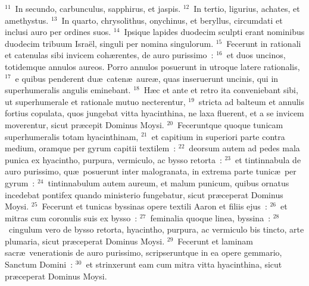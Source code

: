 ${}^{11}$~In secundo, carbunculus, sapphirus, et jaspis.
${}^{12}$~In tertio, ligurius, achates, et amethystus.
${}^{13}$~In quarto, chrysolithus, onychinus, et beryllus, circumdati et inclusi auro per ordines suos.
${}^{14}$~Ipsique lapides duodecim sculpti erant nominibus duodecim tribuum Isra\"el, singuli per nomina singulorum.
${}^{15}$~Fecerunt in rationali et catenulas sibi invicem coh\ae rentes, de auro purissimo~:
${}^{16}$~et duos uncinos, totidemque annulos aureos. Porro annulos posuerunt in utroque latere rationalis,
${}^{17}$~e quibus penderent du\ae\ caten\ae\ aure\ae , quas inseruerunt uncinis, qui in superhumeralis angulis eminebant.
${}^{18}$~H\ae c et ante et retro ita conveniebant sibi, ut superhumerale et rationale mutuo necterentur,
${}^{19}$~stricta ad balteum et annulis fortius copulata, quos jungebat vitta hyacinthina, ne laxa fluerent, et a se invicem moverentur, sicut pr\ae cepit Dominus Moysi.
${}^{20}$~Feceruntque quoque tunicam superhumeralis totam hyacinthinam,
${}^{21}$~et capitium in superiori parte contra medium, oramque per gyrum capitii textilem~:
${}^{22}$~deorsum autem ad pedes mala punica ex hyacintho, purpura, vermiculo, ac bysso retorta~:
${}^{23}$~et tintinnabula de auro purissimo, qu\ae\ posuerunt inter malogranata, in extrema parte tunic\ae\ per gyrum~:
${}^{24}$~tintinnabulum autem aureum, et malum punicum, quibus ornatus incedebat pontifex quando ministerio fungebatur, sicut pr\ae ceperat Dominus Moysi.
${}^{25}$~Fecerunt et tunicas byssinas opere textili Aaron et filiis ejus~:
${}^{26}$~et mitras cum coronulis suis ex bysso~:
${}^{27}$~feminalia quoque linea, byssina~:
${}^{28}$~cingulum vero de bysso retorta, hyacintho, purpura, ac vermiculo bis tincto, arte plumaria, sicut pr\ae ceperat Dominus Moysi.
${}^{29}$~Fecerunt et laminam sacr\ae\ venerationis de auro purissimo, scripseruntque in ea opere gemmario, Sanctum Domini~:
${}^{30}$~et strinxerunt eam cum mitra vitta hyacinthina, sicut pr\ae ceperat Dominus Moysi.


